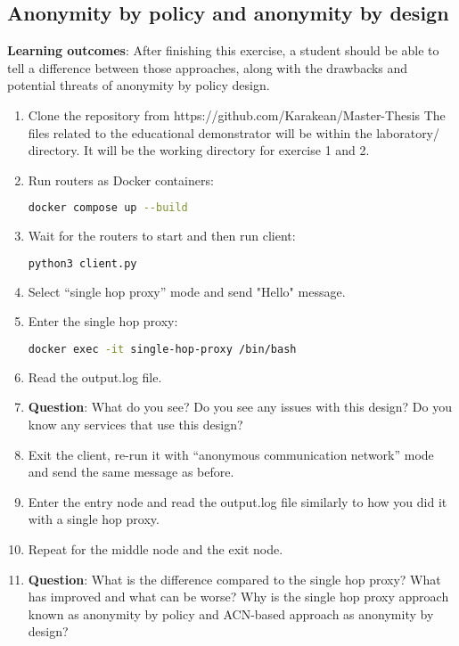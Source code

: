 \subsection{Anonymity by policy and anonymity by design}
\textbf{Learning outcomes}: After finishing this exercise, a student should be able to tell a difference between those approaches, along with the drawbacks and potential threats of anonymity by policy design.
\begin{enumerate}
    \item Clone the repository from https://github.com/Karakean/Master-Thesis
    The files related to the educational demonstrator will be within the laboratory/ directory. It will be the working directory for exercise 1 and 2.
    \item Run routers as Docker containers:
    \begin{lstlisting}[language=bash]
    docker compose up --build
    \end{lstlisting}
    \item Wait for the routers to start and then run client:
    \begin{lstlisting}[language=bash]
    python3 client.py
    \end{lstlisting}
    \item Select “single hop proxy” mode and send "Hello" message.
    \item Enter the single hop proxy:
    \begin{lstlisting}[language=bash]
    docker exec -it single-hop-proxy /bin/bash
    \end{lstlisting}
    \item Read the output.log file.
    \item \textbf{Question}: What do you see? Do you see any issues with this design? Do you know any services that use this design?
    \item Exit the client, re-run it with “anonymous communication network” mode and send the same message as before.
    \item Enter the entry node and read the output.log file similarly to how you did it with a single hop proxy.
    \item Repeat for the middle node and the exit node.
    \item \textbf{Question}: What is the difference compared to the single hop proxy? What has improved and what can be worse? Why is the single hop proxy approach known as anonymity by policy and ACN-based approach as anonymity by design?
\end{enumerate}

